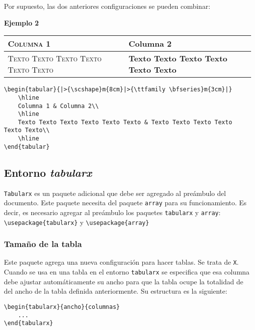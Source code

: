 	Por supuesto, las dos anteriores configuraciones se pueden combinar:
	
	\textbf{Ejemplo 2}
	
	\begin{center}
		\begin{tabular}{|>{\scshape}m{8cm}|>{\ttfamily \bfseries}m{3cm}|}
			\hline
			Columna 1 & Columna 2\\
			\hline		
			Texto Texto Texto Texto Texto Texto & Texto Texto Texto Texto Texto Texto\\
			\hline	
		\end{tabular}
	\end{center}
	
	\begin{myquote}
		\begin{lstlisting}
\begin{tabular}{|>{\scshape}m{8cm}|>{\ttfamily \bfseries}m{3cm}|}
	\hline
	Columna 1 & Columna 2\\
	\hline		
	Texto Texto Texto Texto Texto Texto & Texto Texto Texto Texto Texto Texto\\
	\hline	
\end{tabular}			
		\end{lstlisting}
	\end{myquote}	
	
	\subsection{Entorno \textsl{tabularx}}
	
	\verb|Tabularx| es un paquete adicional que debe ser agregado al preámbulo del documento. Este paquete necesita del paquete \verb|array| para su funcionamiento. Es decir, es necesario agregar al preámbulo los paquetes \verb|tabularx| y \verb|array|:\\ \verb|\usepackage{tabularx}| y \verb|\usepackage{array}|
	
	\subsubsection{Tamaño de la tabla}
	
	Este paquete agrega una nueva configuración para hacer tablas. Se trata de \verb|X|. Cuando se usa en una tabla en el entorno \verb|tabularx| se especifica que esa columna debe ajustar automáticamente su ancho para que la tabla ocupe la totalidad de del ancho de la tabla definida anteriormente. Su estructura es la siguiente:
	
	\begin{myquote}
		\begin{lstlisting}
\begin{tabularx}{ancho}{columnas}
	...
\end{tabularx}			
		\end{lstlisting}		
	\end{myquote}
	
